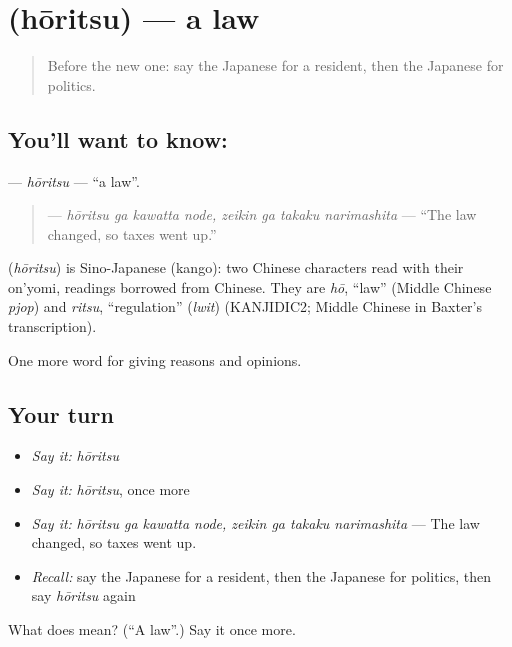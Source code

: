 \section[\texorpdfstring{\ja{ほうりつ} (hōritsu)}{ほうりつ (hōritsu)}]{ (hōritsu) — a law}

\label{lesson:JA-C331-houritsu}



\begin{quote}
Before the new one: say the Japanese for a resident, then the Japanese for politics.
\end{quote}

\subsection*{You'll want to know: }
\textbf{} — \emph{hōritsu} — \textquotedblleft{}a law\textquotedblright{}.

\begin{quote}
\textbf{   } — \emph{hōritsu ga kawatta node, zeikin ga takaku narimashita} — \textquotedblleft{}The law changed, so taxes went up.\textquotedblright{}
\end{quote}

\begin{cousinweb}
\textbf{} (\emph{hōritsu}) is Sino-Japanese (kango): two Chinese characters read with their on'yomi, readings borrowed from Chinese. They are \emph{hō}, \textquotedblleft{}law\textquotedblright{} (Middle Chinese \emph{pjop}) and \emph{ritsu}, \textquotedblleft{}regulation\textquotedblright{} (\emph{lwit}) (KANJIDIC2; Middle Chinese in Baxter's transcription).
\end{cousinweb}

\begin{grammarlens}[title={What you've built}]
One more word for giving reasons and opinions.
\end{grammarlens}

\subsection*{Your turn}
\begin{itemize}
\raggedright
  \item \emph{Say it:} \emph{hōritsu}
  \item \emph{Say it:} \emph{hōritsu}, once more
  \item \emph{Say it:} \emph{hōritsu ga kawatta node, zeikin ga takaku narimashita} — The law changed, so taxes went up.
  \item \emph{Recall:} say the Japanese for a resident, then the Japanese for politics, then say \emph{hōritsu} again
\end{itemize}

\begin{tcolorbox}[breakable,colback=teal!4,colframe=teal!35!black,title={Before you move on}]
What does  mean? (\textquotedblleft{}A law\textquotedblright{}.) Say it once more.
\end{tcolorbox}
